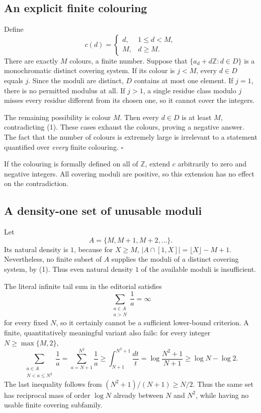 \subsection{An explicit finite colouring}
Define
\[
 c(d)=\begin{cases}d,&1\le d<M,\\M,&d\ge M.\end{cases}
\]
There are exactly $M$ colours, a finite number. Suppose that $\{a_d+d\mathbb Z:d\in D\}$ is a monochromatic distinct covering system. If its colour is $j<M$, every $d\in D$ equals $j$. Since the moduli are distinct, $D$ contains at most one element. If $j=1$, there is no permitted modulus at all. If $j>1$, a single residue class modulo $j$ misses every residue different from its chosen one, so it cannot cover the integers.

The remaining possibility is colour $M$. Then every $d\in D$ is at least $M$, contradicting (1). These cases exhaust the colours, proving a negative answer. The fact that the number of colours is extremely large is irrelevant to a statement quantified over \emph{every} finite colouring. \hfill$\square$

If the colouring is formally defined on all of $\mathbb Z$, extend $c$ arbitrarily to zero and negative integers. All covering moduli are positive, so this extension has no effect on the contradiction.

\subsection{A density-one set of unusable moduli}
Let
\[
 A=\{M,M+1,M+2,\ldots\}.
\]
Its natural density is $1$, because for $X\ge M$,
$|A\cap[1,X]|=\lfloor X\rfloor-M+1$. Nevertheless, no finite subset of $A$ supplies the moduli of a distinct covering system, by (1). Thus even natural density $1$ of the available moduli is insufficient.

The literal infinite tail sum in the editorial satisfies
\[
 \sum_{\substack{a\in A\\a>N}}\frac1a=\infty
\]
for every fixed $N$, so it certainly cannot be a sufficient lower-bound criterion. A finite, quantitatively meaningful variant also fails: for every integer $N\ge\max\{M,2\}$,
\[
 \sum_{\substack{a\in A\\N<a\le N^2}}\frac1a
 =\sum_{a=N+1}^{N^2}\frac1a
 \ge\int_{N+1}^{N^2+1}\frac{dt}{t}
 =\log\frac{N^2+1}{N+1}
 \ge\log N-\log2.
\]
The last inequality follows from $(N^2+1)/(N+1)\ge N/2$. Thus the same set has reciprocal mass of order $\log N$ already between $N$ and $N^2$, while having no usable finite covering subfamily.


